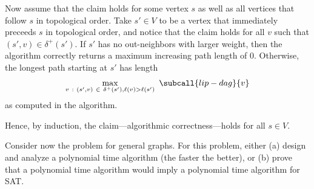 \documentclass{article}
\begin{document}
\begin{solution}
\begin{subproof}[Correctness]
Now assume that the claim holds for some vertex $s$ as well as all vertices that follow $s$ in topological order. Take $s' \in V$ to be a vertex that immediately preceeds $s$ in topological order, and notice that the claim holds for all $v$ such that $(s',v) \in \delta^{+}(s')$.
If $s'$ has no out-neighbors with larger weight, then the algorithm correctly returns a maximum increasing path length of 0. Otherwise, the longest path starting at $s'$ has length
\begin{align*}
    \max_{v \ : \ (s',v) \ \in \ \delta^{+}(s'), \ell(v) > \ell(s')} \ \subcall{lip-dag}{v}
\end{align*}
as computed in the algorithm.

Hence, by induction, the claim---algorithmic correctness---holds for all $s \in V$.

\end{subproof}

\end{solution}
\pagebreak





\begin{subexercise}
  Consider now the problem for general graphs. For this problem, either (a) design and analyze a polynomial time algorithm (the faster the better), or (b) prove that a polynomial time algorithm would imply a polynomial time algorithm for SAT.
\end{subexercise}
\end{document}
